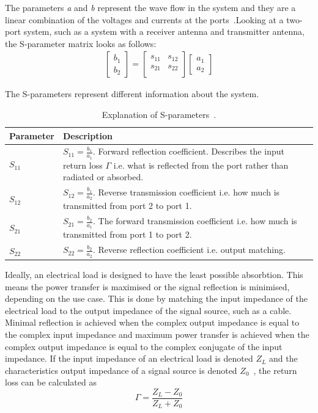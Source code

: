 The parameters \textit{a} and \textit{b} represent the wave flow in the system and they are a linear combination of the voltages and currents at the ports~\cite{ming_notes}.Looking at a two-port system, such as a system with a receiver antenna and transmitter antenna, the S-parameter matrix looks as follows:
\begin{align} \label{eq:s_matrix}
    \begin{bmatrix} b_1 \\ b_2 \end{bmatrix} = 
    \begin{bmatrix} s_{11} & s_{12} \\ s_{21} & s_{22} \\ \end{bmatrix} \begin{bmatrix} a_1 \\ a_2 \end{bmatrix}
\end{align}

The S-parameters represent different information about the system.
\begin{table}[H]
    \centering
    \begin{tabular}{p{}|p{}}
        \textbf{Parameter} & \textbf{Description} \\
        \hline
        \hline
        $S_{11}$ & $S_{11}=\frac{b_1}{a_1}$. Forward reflection coefficient. Describes the input return loss $\Gamma$ i.e. what is reflected from the port rather than radiated or absorbed. \\
        $S_{12}$ & $S_{12}=\frac{b_1}{a_2}$. Reverse transmission coefficient i.e. how much is transmitted from port 2 to port 1. \\
        $S_{21}$ & $S_{21}=\frac{b_2}{a_1}$. The forward transmission coefficient i.e. how much is transmitted from port 1 to port 2. \\
        $S_{22}$ & $S_{22}=\frac{b_2}{a_2}$. Reverse reflection coefficient i.e. output matching. \\
    \end{tabular}
    \caption{Explanation of S-parameters~\cite{s_params}.}
    \label{tab:s_params}
\end{table}

Ideally, an electrical load is designed to have the least possible absorbtion. This means the power transfer is maximised or the signal reflection is minimised, depending on the use case. This is done by matching the input impedance of the electrical load to the output impedance of the signal source, such as a cable. Minimal reflection is achieved when the complex output impedance is equal to the complex input impedance and maximum power transfer is achieved when the complex output impedance is equal to the complex conjugate of the input impedance. If the input impedance of an electrical load is denoted $Z_L$ and the characteristics output impedance of a signal source is denoted $Z_0$~\cite{s_params}\cite{ming_notes}, the return loss can be calculated as
\begin{equation} \label{return_loss}
    \Gamma = \frac{Z_L-Z_0}{Z_L+Z_0}
\end{equation}

